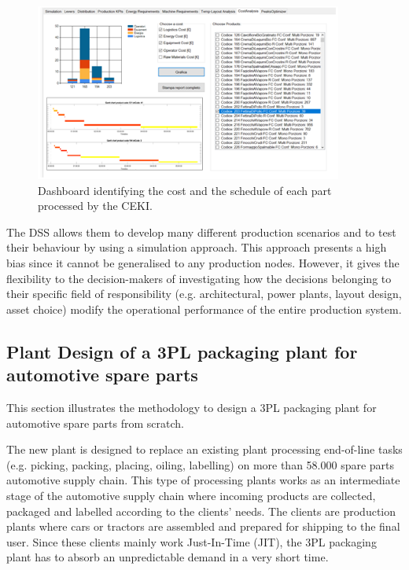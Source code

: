 \begin{figure}[hbt!]
\centering
\includegraphics[width=0.9\textwidth]{sectionProduction/design_plant_figures/fig_prod_CAMST_cost.png}
\captionsetup{type=figure}
\caption{Dashboard identifying the cost and the schedule of each part processed by the CEKI.}
\label{fig_prod_CAMST_cost}
\end{figure}

The DSS allows them to develop many different production scenarios and to test their behaviour by using a simulation approach. This approach presents a high bias since it cannot be generalised to any production nodes. However, it gives the flexibility to the decision-makers of investigating how the decisions belonging to their specific field of responsibility (e.g. architectural, power plants, layout design, asset choice) modify the operational performance of the entire production system.

\subsection{Plant Design of a 3PL packaging plant for automotive spare parts}
This section illustrates the methodology to design a 3PL packaging plant for automotive spare parts from scratch.\par

The new plant is designed to replace an existing plant processing end-of-line tasks (e.g. picking, packing, placing, oiling, labelling) on more than 58.000 spare parts automotive supply chain. This type of processing plants works as an intermediate stage of the automotive supply chain where incoming products are collected, packaged and labelled according to the clients' needs. The clients are production plants where cars or tractors are assembled and prepared for shipping to the final user. Since these clients mainly work Just-In-Time (JIT), the 3PL packaging plant has to absorb an unpredictable demand in a very short time. \par

